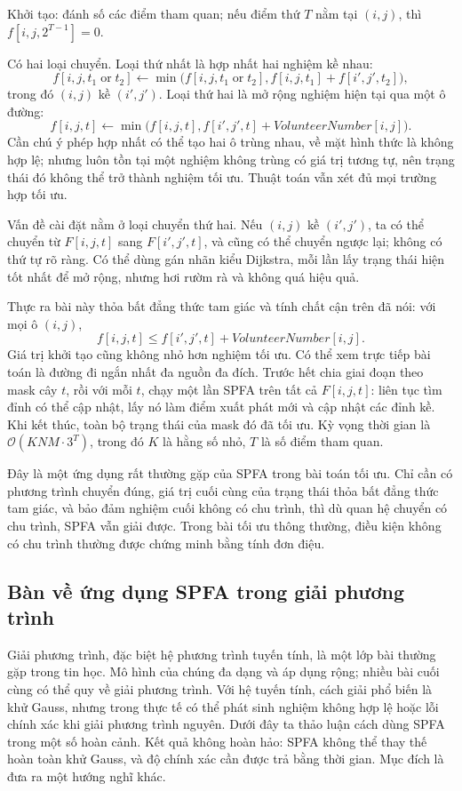 \documentclass[11pt]{article}
\newcommand{\Oh}{\mathcal{O}}
\begin{document}
Khởi tạo: đánh số các điểm tham quan; nếu điểm thứ \(T\) nằm tại \((i,j)\),
thì \(f[i,j,2^{T-1}]=0\).

Có hai loại chuyển. Loại thứ nhất là hợp nhất hai nghiệm kề nhau:
\[
  f[i,j,t_1\operatorname{or}t_2]
  \gets \min\bigl(f[i,j,t_1\operatorname{or}t_2],
  f[i,j,t_1]+f[i',j',t_2]\bigr),
\]
trong đó \((i,j)\) kề \((i',j')\). Loại thứ hai là mở rộng nghiệm hiện tại qua
một ô đường:
\[
  f[i,j,t]\gets
  \min\bigl(f[i,j,t], f[i',j',t]+\mathit{VolunteerNumber}[i,j]\bigr).
\]
Cần chú ý phép hợp nhất có thể tạo hai ô trùng nhau, về mặt hình thức là
không hợp lệ; nhưng luôn tồn tại một nghiệm không trùng có giá trị tương tự,
nên trạng thái đó không thể trở thành nghiệm tối ưu. Thuật toán vẫn xét đủ
mọi trường hợp tối ưu.

Vấn đề cài đặt nằm ở loại chuyển thứ hai. Nếu \((i,j)\) kề \((i',j')\), ta có
thể chuyển từ \(F[i,j,t]\) sang \(F[i',j',t]\), và cũng có thể chuyển ngược
lại; không có thứ tự rõ ràng. Có thể dùng gán nhãn kiểu Dijkstra, mỗi lần lấy
trạng thái hiện tốt nhất để mở rộng, nhưng hơi rườm rà và không quá hiệu quả.

Thực ra bài này thỏa bất đẳng thức tam giác và tính chất cận trên đã nói:
với mọi ô \((i,j)\),
\[
  f[i,j,t]\le f[i',j',t]+\mathit{VolunteerNumber}[i,j].
\]
Giá trị khởi tạo cũng không nhỏ hơn nghiệm tối ưu. Có thể xem trực tiếp bài
toán là đường đi ngắn nhất đa nguồn đa đích. Trước hết chia giai đoạn theo
mask cây \(t\), rồi với mỗi \(t\), chạy một lần SPFA trên tất cả \(F[i,j,t]\):
liên tục tìm đỉnh có thể cập nhật, lấy nó làm điểm xuất phát mới và cập nhật
các đỉnh kề. Khi kết thúc, toàn bộ trạng thái của mask đó đã tối ưu. Kỳ vọng
thời gian là \(\Oh(KNM\cdot 3^T)\), trong đó \(K\) là hằng số nhỏ, \(T\) là
số điểm tham quan.

Đây là một ứng dụng rất thường gặp của SPFA trong bài toán tối ưu. Chỉ cần có
phương trình chuyển đúng, giá trị cuối cùng của trạng thái thỏa bất đẳng thức
tam giác, và bảo đảm nghiệm cuối không có chu trình, thì dù quan hệ chuyển có
chu trình, SPFA vẫn giải được. Trong bài tối ưu thông thường, điều kiện không
có chu trình thường được chứng minh bằng tính đơn điệu.

\subsection{Bàn về ứng dụng SPFA trong giải phương trình}

Giải phương trình, đặc biệt hệ phương trình tuyến tính, là một lớp bài thường
gặp trong tin học. Mô hình của chúng đa dạng và áp dụng rộng; nhiều bài cuối
cùng có thể quy về giải phương trình. Với hệ tuyến tính, cách giải phổ biến
là khử Gauss, nhưng trong thực tế có thể phát sinh nghiệm không hợp lệ hoặc
lỗi chính xác khi giải phương trình nguyên. Dưới đây ta thảo luận cách dùng
SPFA trong một số hoàn cảnh. Kết quả không hoàn hảo: SPFA không thể thay thế
hoàn toàn khử Gauss, và độ chính xác cần được trả bằng thời gian. Mục đích là
đưa ra một hướng nghĩ khác.
\end{document}
